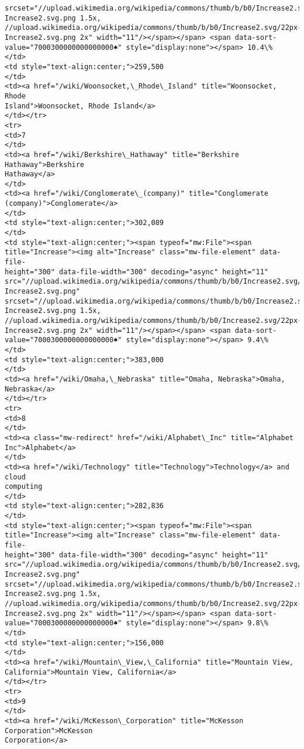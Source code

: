 \documentclass[11pt]{article}
\begin{document}
\begin{Verbatim}[commandchars=\\\{\}]
srcset="//upload.wikimedia.org/wikipedia/commons/thumb/b/b0/Increase2.svg/17px-
Increase2.svg.png 1.5x,
//upload.wikimedia.org/wikipedia/commons/thumb/b/b0/Increase2.svg/22px-
Increase2.svg.png 2x" width="11"/></span></span> <span data-sort-
value="7000300000000000000♠" style="display:none"></span> 10.4\%
</td>
<td style="text-align:center;">259,500
</td>
<td><a href="/wiki/Woonsocket,\_Rhode\_Island" title="Woonsocket, Rhode
Island">Woonsocket, Rhode Island</a>
</td></tr>
<tr>
<td>7
</td>
<td><a href="/wiki/Berkshire\_Hathaway" title="Berkshire Hathaway">Berkshire
Hathaway</a>
</td>
<td><a href="/wiki/Conglomerate\_(company)" title="Conglomerate
(company)">Conglomerate</a>
</td>
<td style="text-align:center;">302,089
</td>
<td style="text-align:center;"><span typeof="mw:File"><span
title="Increase"><img alt="Increase" class="mw-file-element" data-file-
height="300" data-file-width="300" decoding="async" height="11"
src="//upload.wikimedia.org/wikipedia/commons/thumb/b/b0/Increase2.svg/11px-
Increase2.svg.png"
srcset="//upload.wikimedia.org/wikipedia/commons/thumb/b/b0/Increase2.svg/17px-
Increase2.svg.png 1.5x,
//upload.wikimedia.org/wikipedia/commons/thumb/b/b0/Increase2.svg/22px-
Increase2.svg.png 2x" width="11"/></span></span> <span data-sort-
value="7000300000000000000♠" style="display:none"></span> 9.4\%
</td>
<td style="text-align:center;">383,000
</td>
<td><a href="/wiki/Omaha,\_Nebraska" title="Omaha, Nebraska">Omaha, Nebraska</a>
</td></tr>
<tr>
<td>8
</td>
<td><a class="mw-redirect" href="/wiki/Alphabet\_Inc" title="Alphabet
Inc">Alphabet</a>
</td>
<td><a href="/wiki/Technology" title="Technology">Technology</a> and cloud
computing
</td>
<td style="text-align:center;">282,836
</td>
<td style="text-align:center;"><span typeof="mw:File"><span
title="Increase"><img alt="Increase" class="mw-file-element" data-file-
height="300" data-file-width="300" decoding="async" height="11"
src="//upload.wikimedia.org/wikipedia/commons/thumb/b/b0/Increase2.svg/11px-
Increase2.svg.png"
srcset="//upload.wikimedia.org/wikipedia/commons/thumb/b/b0/Increase2.svg/17px-
Increase2.svg.png 1.5x,
//upload.wikimedia.org/wikipedia/commons/thumb/b/b0/Increase2.svg/22px-
Increase2.svg.png 2x" width="11"/></span></span> <span data-sort-
value="7000300000000000000♠" style="display:none"></span> 9.8\%
</td>
<td style="text-align:center;">156,000
</td>
<td><a href="/wiki/Mountain\_View,\_California" title="Mountain View,
California">Mountain View, California</a>
</td></tr>
<tr>
<td>9
</td>
<td><a href="/wiki/McKesson\_Corporation" title="McKesson Corporation">McKesson
Corporation</a>

\end{Verbatim}
\end{document}
